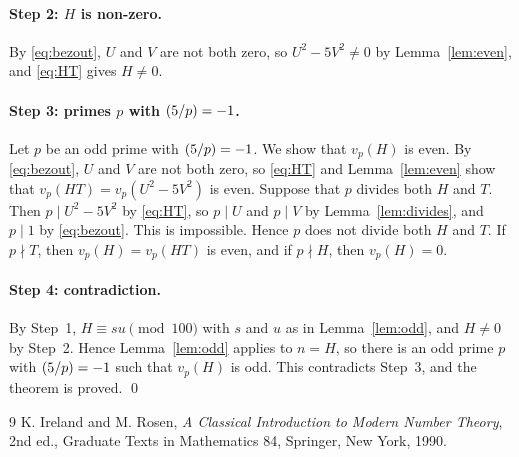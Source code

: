 \documentclass[11pt]{article}
\newcommand{\leg}[2]{\mathchoice{\biggl(\dfrac{#1}{#2}\biggr)}{(#1/#2)}{(#1/#2)}{(#1/#2)}}
\begin{document}
\paragraph{Step 2: $H$ is non-zero.} By \eqref{eq:bezout}, $U$ and $V$ are not both zero, so $U^2-5V^2\neq0$ by Lemma~\ref{lem:even}, and \eqref{eq:HT} gives $H\neq0$.

\paragraph{\texorpdfstring{Step 3: primes $p$ with $\leg{5}{p}=-1$.}{Step 3: inert primes.}} Let $p$ be an odd prime with $\leg{5}{p}=-1$. We show that $v_p(H)$ is even. By \eqref{eq:bezout}, $U$ and $V$ are not both zero, so \eqref{eq:HT} and Lemma~\ref{lem:even} show that $v_p(HT)=v_p(U^2-5V^2)$ is even. Suppose that $p$ divides both $H$ and $T$. Then $p\mid U^2-5V^2$ by \eqref{eq:HT}, so $p\mid U$ and $p\mid V$ by Lemma~\ref{lem:divides}, and $p\mid 1$ by \eqref{eq:bezout}. This is impossible. Hence $p$ does not divide both $H$ and $T$. If $p\nmid T$, then $v_p(H)=v_p(HT)$ is even, and if $p\nmid H$, then $v_p(H)=0$.

\paragraph{Step 4: contradiction.} By Step~1, $H\equiv su\pmod{100}$ with $s$ and $u$ as in Lemma~\ref{lem:odd}, and $H\neq0$ by Step~2. Hence Lemma~\ref{lem:odd} applies to $n=H$, so there is an odd prime $p$ with $\leg{5}{p}=-1$ such that $v_p(H)$ is odd. This contradicts Step~3, and the theorem is proved.
\qed

\begin{thebibliography}{9}
 K. Ireland and M. Rosen, \emph{A Classical Introduction to Modern Number Theory}, 2nd ed., Graduate Texts in Mathematics 84, Springer, New York, 1990.
\end{thebibliography}
\end{document}
